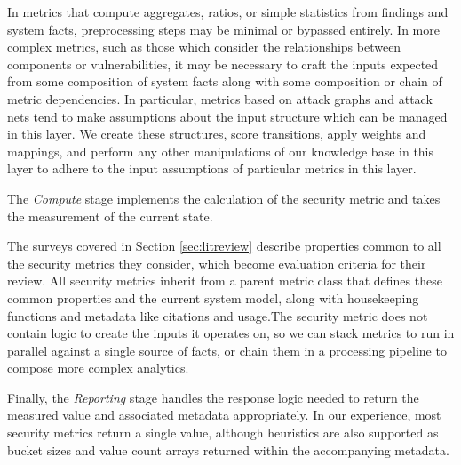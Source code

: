 In metrics that compute aggregates, ratios, or simple statistics from findings and system facts, preprocessing steps may be minimal or bypassed entirely. In more complex metrics, such as those which consider the relationships between components or vulnerabilities, it may be necessary to craft the inputs expected from some composition of system facts along with some composition or chain of metric dependencies. In particular, metrics based on attack graphs and attack nets tend to make assumptions about the input structure which can be managed in this layer. We create these structures, score transitions, apply weights and mappings, and perform any other manipulations of our knowledge base in this layer to adhere to the input assumptions of particular metrics in this layer. 


The \textit{Compute} stage implements the calculation of the security metric and takes the measurement of the current state. 

The surveys covered in Section \ref{sec:litreview} describe properties common to all the security metrics they consider, which become evaluation criteria for their review. All security metrics inherit from a parent metric class that defines these common properties and the current system model, along with housekeeping functions and metadata like citations and usage.The security metric does not contain logic to create the inputs it operates on, so we can stack metrics to run in parallel against a single source of facts, or chain them in a processing pipeline to compose more complex analytics. 



Finally, the \textit{Reporting} stage handles the response logic needed to return the measured value and associated metadata appropriately. In our experience, most security metrics return a single value, although heuristics are also supported as bucket sizes and value count arrays returned within the accompanying metadata. 


